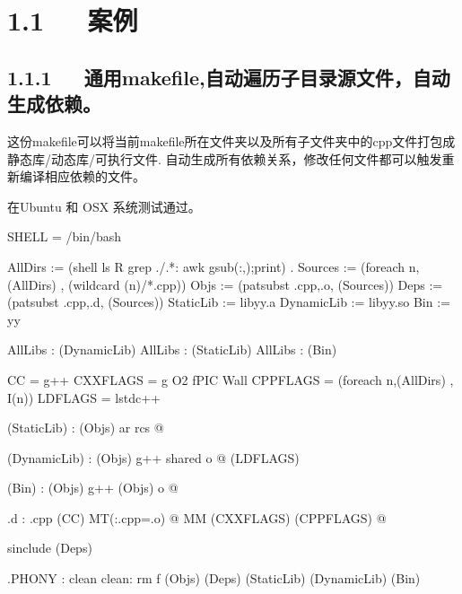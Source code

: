 \documentclass[letterpaper,12pt,english]{sphinxmanual}
\begin{document}
\section{1.1   案例}
\label{\detokenize{004.study/001._u7f16_u7a0b/001.make/makefile:id2}}

\subsection{1.1.1   通用makefile,自动遍历子目录源文件，自动生成依赖。}
\label{\detokenize{004.study/001._u7f16_u7a0b/001.make/makefile:makefile}}

这份makefile可以将当前makefile所在文件夹以及所有子文件夹中的cpp文件打包成静态库/动态库/可执行文件.
自动生成所有依赖关系，修改任何文件都可以触发重新编译相应依赖的文件。

在Ubuntu 和 OSX 系统测试通过。

\begin{sphinxVerbatim}[commandchars=\\\{\}]
SHELL = /bin/bash

AllDirs := \PYGZdl{}(shell ls \PYGZhy{}R \textbar{} grep \PYGZsq{}\PYGZca{}\PYGZbs{}./.*:\PYGZdl{}\PYGZdl{}\PYGZsq{} \textbar{} awk \PYGZsq{}\PYGZob{}gsub(\PYGZdq{}:\PYGZdq{},\PYGZdq{}\PYGZdq{});print\PYGZcb{}\PYGZsq{}) .
Sources := \PYGZdl{}(foreach n,\PYGZdl{}(AllDirs) , \PYGZdl{}(wildcard \PYGZdl{}(n)/*.cpp))
Objs := \PYGZdl{}(patsubst \PYGZpc{}.cpp,\PYGZpc{}.o, \PYGZdl{}(Sources))
Deps := \PYGZdl{}(patsubst \PYGZpc{}.cpp,\PYGZpc{}.d, \PYGZdl{}(Sources))
StaticLib := libyy.a
DynamicLib := libyy.so
Bin := yy

\PYGZsh{}AllLibs : \PYGZdl{}(DynamicLib)
\PYGZsh{}AllLibs : \PYGZdl{}(StaticLib)
AllLibs : \PYGZdl{}(Bin)

CC = g++
CXXFLAGS = \PYGZhy{}g \PYGZhy{}O2 \PYGZhy{}fPIC \PYGZhy{}Wall
CPPFLAGS = \PYGZdl{}(foreach n,\PYGZdl{}(AllDirs) , \PYGZhy{}I\PYGZdl{}(n))
LDFLAGS = \PYGZhy{}lstdc++

\PYGZdl{}(StaticLib) : \PYGZdl{}(Objs)
    ar rcs \PYGZdl{}@ \PYGZdl{}\PYGZca{}

\PYGZdl{}(DynamicLib) : \PYGZdl{}(Objs)
    g++ \PYGZhy{}shared \PYGZhy{}o \PYGZdl{}@ \PYGZdl{}\PYGZca{} \PYGZdl{}(LDFLAGS)

\PYGZdl{}(Bin) : \PYGZdl{}(Objs)
    g++ \PYGZdl{}(Objs) \PYGZhy{}o \PYGZdl{}@

\PYGZpc{}.d : \PYGZpc{}.cpp
    \PYGZdl{}(CC) \PYGZhy{}MT\PYGZdq{}\PYGZdl{}(\PYGZlt{}:.cpp=.o) \PYGZdl{}@\PYGZdq{} \PYGZhy{}MM \PYGZdl{}(CXXFLAGS) \PYGZdl{}(CPPFLAGS) \PYGZdl{}\PYGZlt{} \PYGZgt{} \PYGZdl{}@

sinclude \PYGZdl{}(Deps)

.PHONY : clean
clean:
    rm \PYGZhy{}f \PYGZdl{}(Objs) \PYGZdl{}(Deps) \PYGZdl{}(StaticLib) \PYGZdl{}(DynamicLib) \PYGZdl{}(Bin)
\end{sphinxVerbatim}
\end{document}

